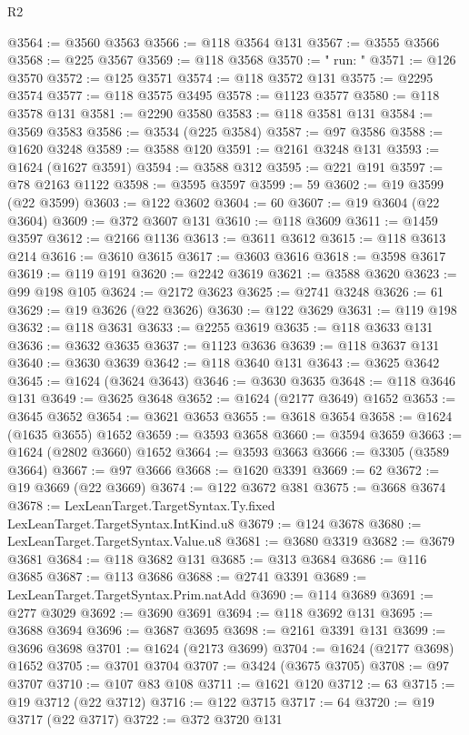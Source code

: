 \begin{lexlean}{R2}
\begin{coremodule}
@3564 := @3560 @3563
@3566 := @118 @3564 @131
@3567 := @3555 @3566
@3568 := @225 @3567
@3569 := @118 @3568
@3570 := "        run: "
@3571 := @126 @3570
@3572 := @125 @3571
@3574 := @118 @3572 @131
@3575 := @2295 @3574
@3577 := @118 @3575 @3495
@3578 := @1123 @3577
@3580 := @118 @3578 @131
@3581 := @2290 @3580
@3583 := @118 @3581 @131
@3584 := @3569 @3583
@3586 := @3534 (@225 @3584)
@3587 := @97 @3586
@3588 := @1620 @3248
@3589 := @3588 @120
@3591 := @2161 @3248 @131
@3593 := @1624 (@1627 @3591)
@3594 := @3588 @312
@3595 := @221 @191
@3597 := @78 @2163 @1122
@3598 := @3595 @3597
@3599 := 59
@3602 := @19 @3599 (@22 @3599)
@3603 := @122 @3602
@3604 := 60
@3607 := @19 @3604 (@22 @3604)
@3609 := @372 @3607 @131
@3610 := @118 @3609
@3611 := @1459 @3597
@3612 := @2166 @1136
@3613 := @3611 @3612
@3615 := @118 @3613 @214
@3616 := @3610 @3615
@3617 := @3603 @3616
@3618 := @3598 @3617
@3619 := @119 @191
@3620 := @2242 @3619
@3621 := @3588 @3620
@3623 := @99 @198 @105
@3624 := @2172 @3623
@3625 := @2741 @3248
@3626 := 61
@3629 := @19 @3626 (@22 @3626)
@3630 := @122 @3629
@3631 := @119 @198
@3632 := @118 @3631
@3633 := @2255 @3619
@3635 := @118 @3633 @131
@3636 := @3632 @3635
@3637 := @1123 @3636
@3639 := @118 @3637 @131
@3640 := @3630 @3639
@3642 := @118 @3640 @131
@3643 := @3625 @3642
@3645 := @1624 (@3624 @3643)
@3646 := @3630 @3635
@3648 := @118 @3646 @131
@3649 := @3625 @3648
@3652 := @1624 (@2177 @3649) @1652
@3653 := @3645 @3652
@3654 := @3621 @3653
@3655 := @3618 @3654
@3658 := @1624 (@1635 @3655) @1652
@3659 := @3593 @3658
@3660 := @3594 @3659
@3663 := @1624 (@2802 @3660) @1652
@3664 := @3593 @3663
@3666 := @3305 (@3589 @3664)
@3667 := @97 @3666
@3668 := @1620 @3391
@3669 := 62
@3672 := @19 @3669 (@22 @3669)
@3674 := @122 @3672 @381
@3675 := @3668 @3674
@3678 := LexLeanTarget.TargetSyntax.Ty.fixed LexLeanTarget.TargetSyntax.IntKind.u8
@3679 := @124 @3678
@3680 := LexLeanTarget.TargetSyntax.Value.u8
@3681 := @3680 @3319
@3682 := @3679 @3681
@3684 := @118 @3682 @131
@3685 := @313 @3684
@3686 := @116 @3685
@3687 := @113 @3686
@3688 := @2741 @3391
@3689 := LexLeanTarget.TargetSyntax.Prim.natAdd
@3690 := @114 @3689
@3691 := @277 @3029
@3692 := @3690 @3691
@3694 := @118 @3692 @131
@3695 := @3688 @3694
@3696 := @3687 @3695
@3698 := @2161 @3391 @131
@3699 := @3696 @3698
@3701 := @1624 (@2173 @3699)
@3704 := @1624 (@2177 @3698) @1652
@3705 := @3701 @3704
@3707 := @3424 (@3675 @3705)
@3708 := @97 @3707
@3710 := @107 @83 @108
@3711 := @1621 @120
@3712 := 63
@3715 := @19 @3712 (@22 @3712)
@3716 := @122 @3715
@3717 := 64
@3720 := @19 @3717 (@22 @3717)
@3722 := @372 @3720 @131

\end{coremodule}
\end{lexlean}
